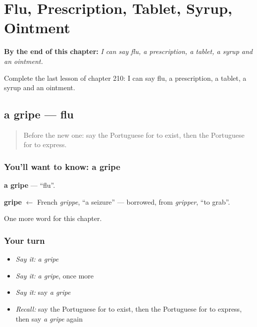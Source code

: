 
\chapter{Flu, Prescription, Tablet, Syrup, Ointment}
\label{ch:pt-flu-prescription-tablet-syrup-ointment}

\begin{chapteropening}
\textbf{By the end of this chapter:} \emph{I can say flu, a prescription, a tablet, a syrup and an ointment.}

Complete the last lesson of chapter 210: I can say flu, a prescription, a tablet, a syrup and an ointment.
\end{chapteropening}

\section[a gripe]{a gripe — flu}

\label{lesson:PT-C210-gripe}



\begin{quote}
Before the new one: say the Portuguese for to exist, then the Portuguese for to express.
\end{quote}

\subsection*{You'll want to know: a gripe}
\textbf{a gripe} — \textquotedblleft{}flu\textquotedblright{}.

\begin{cousinweb}
\textbf{gripe} $\leftarrow$ French \emph{grippe}, \textquotedblleft{}a seizure\textquotedblright{} — borrowed, from \emph{gripper}, \textquotedblleft{}to grab\textquotedblright{}.
\end{cousinweb}

\begin{grammarlens}[title={What you've built}]
One more word for this chapter.
\end{grammarlens}

\subsection*{Your turn}
\begin{itemize}
\raggedright
  \item \emph{Say it:} \emph{a gripe}
  \item \emph{Say it:} \emph{a gripe}, once more
  \item \emph{Say it:} say \emph{a gripe}
  \item \emph{Recall:} say the Portuguese for to exist, then the Portuguese for to express, then say \emph{a gripe} again
\end{itemize}

